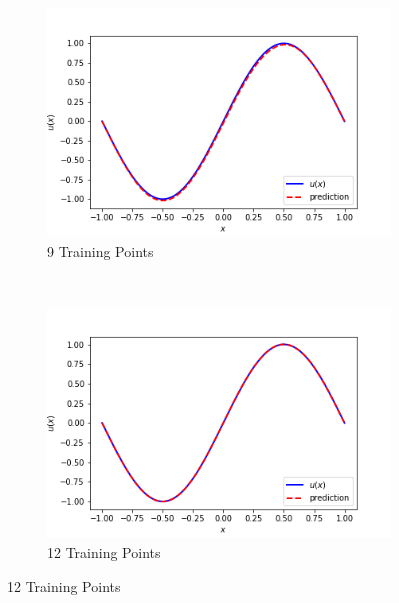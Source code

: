 \documentclass{article}
\begin{document}
\begin{figure}[htbp]
\begin{subfigure}{0.45\textwidth}
        \includegraphics[width=\textwidth]{figures/9TrainingPoints}
        \caption{9 Training Points}
    \end{subfigure}
~ %
    \begin{subfigure}{0.45\textwidth}
        \includegraphics[width=\textwidth]{figures/12TrainingPoints}
        \caption{12 Training Points}
    \end{subfigure}
\end{figure}
\end{document}
